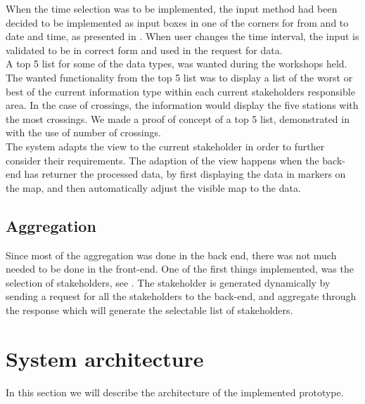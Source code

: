 When the time selection was to be implemented, the input method had been
decided to be implemented as input boxes in one of the corners for from and to 
date and time, as presented in . When user 
changes the time interval, the input is validated to be in correct form and 
used in the request for data.\\

A top 5 list for some of the data types, was wanted during the workshops held. 
The wanted functionality from the top 5 list was to display a list of the 
worst or best of the current information type within each current stakeholders 
responsible area. In the case of crossings, the information would display the 
five stations with the most crossings. We made a proof of concept of a top 5 
list, demonstrated in  with the use of number of crossings.
\\

The system adapts the view to the current stakeholder in order to further
consider their requirements. The adaption of the view happens when the back-end
has returner the processed data, by first displaying the data in markers on the
map, and then automatically adjust the visible map to the data.

\subsection{Aggregation} %
\label{sub:front_end_aggregation}
Since most of the aggregation was done in the back end, there was not much
needed to be done in the front-end. One of the first things implemented, was 
the selection of stakeholders, see . The
stakeholder is generated dynamically by sending a request for all the 
stakeholders to the back-end, and aggregate through the response which will 
generate the selectable list of stakeholders. 


\section{System architecture} %
\label{sec:system_architecture}
In this section we will describe the architecture of the implemented prototype.
\\

